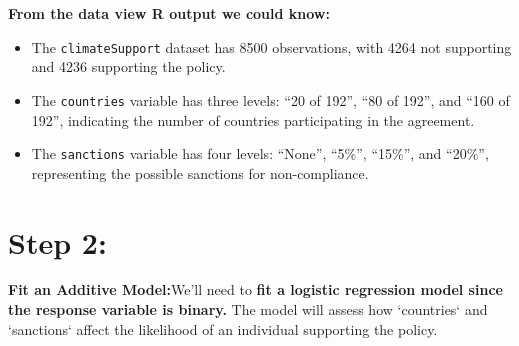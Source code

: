 \documentclass[12pt,letterpaper]{article}
\begin{document}
\newpage
\textbf{From the data view R output we could know:}
\begin{itemize}
  \item The \texttt{climateSupport} dataset has 8500 observations, with 4264 not supporting and 4236 supporting the policy.
  \item The \texttt{countries} variable has three levels: ``20 of 192'', ``80 of 192'', and ``160 of 192'', indicating the number of countries participating in the agreement.
  \item The \texttt{sanctions} variable has four levels: ``None'', ``5\%'', ``15\%'', and ``20\%'', representing the possible sanctions for non-compliance.
\end{itemize}


\section*{Step 2:}
\textbf{ Fit an Additive Model:}We’ll need to \textbf{fit a logistic regression model since the response variable is binary.} The model will assess how `countries` and `sanctions` affect the likelihood of an individual supporting the policy.
\end{document}
